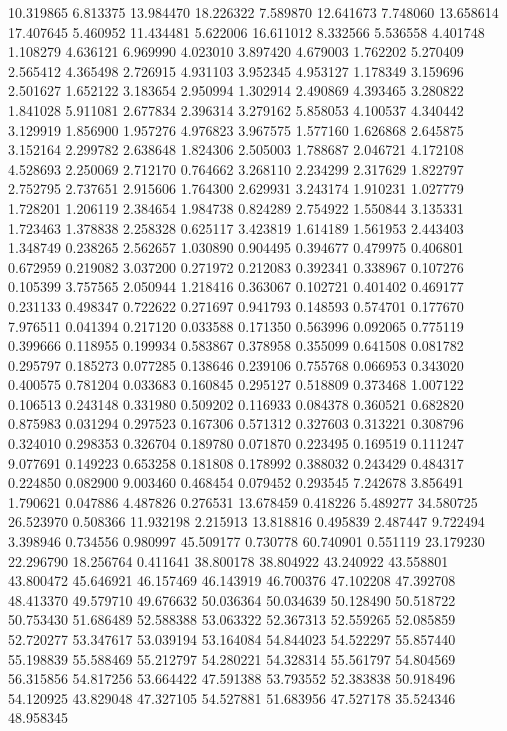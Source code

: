 10.319865
6.813375
13.984470
18.226322
7.589870
12.641673
7.748060
13.658614
17.407645
5.460952
11.434481
5.622006
16.611012
8.332566
5.536558
4.401748
1.108279
4.636121
6.969990
4.023010
3.897420
4.679003
1.762202
5.270409
2.565412
4.365498
2.726915
4.931103
3.952345
4.953127
1.178349
3.159696
2.501627
1.652122
3.183654
2.950994
1.302914
2.490869
4.393465
3.280822
1.841028
5.911081
2.677834
2.396314
3.279162
5.858053
4.100537
4.340442
3.129919
1.856900
1.957276
4.976823
3.967575
1.577160
1.626868
2.645875
3.152164
2.299782
2.638648
1.824306
2.505003
1.788687
2.046721
4.172108
4.528693
2.250069
2.712170
0.764662
3.268110
2.234299
2.317629
1.822797
2.752795
2.737651
2.915606
1.764300
2.629931
3.243174
1.910231
1.027779
1.728201
1.206119
2.384654
1.984738
0.824289
2.754922
1.550844
3.135331
1.723463
1.378838
2.258328
0.625117
3.423819
1.614189
1.561953
2.443403
1.348749
0.238265
2.562657
1.030890
0.904495
0.394677
0.479975
0.406801
0.672959
0.219082
3.037200
0.271972
0.212083
0.392341
0.338967
0.107276
0.105399
3.757565
2.050944
1.218416
0.363067
0.102721
0.401402
0.469177
0.231133
0.498347
0.722622
0.271697
0.941793
0.148593
0.574701
0.177670
7.976511
0.041394
0.217120
0.033588
0.171350
0.563996
0.092065
0.775119
0.399666
0.118955
0.199934
0.583867
0.378958
0.355099
0.641508
0.081782
0.295797
0.185273
0.077285
0.138646
0.239106
0.755768
0.066953
0.343020
0.400575
0.781204
0.033683
0.160845
0.295127
0.518809
0.373468
1.007122
0.106513
0.243148
0.331980
0.509202
0.116933
0.084378
0.360521
0.682820
0.875983
0.031294
0.297523
0.167306
0.571312
0.327603
0.313221
0.308796
0.324010
0.298353
0.326704
0.189780
0.071870
0.223495
0.169519
0.111247
9.077691
0.149223
0.653258
0.181808
0.178992
0.388032
0.243429
0.484317
0.224850
0.082900
9.003460
0.468454
0.079452
0.293545
7.242678
3.856491
1.790621
0.047886
4.487826
0.276531
13.678459
0.418226
5.489277
34.580725
26.523970
0.508366
11.932198
2.215913
13.818816
0.495839
2.487447
9.722494
3.398946
0.734556
0.980997
45.509177
0.730778
60.740901
0.551119
23.179230
22.296790
18.256764
0.411641
38.800178
38.804922
43.240922
43.558801
43.800472
45.646921
46.157469
46.143919
46.700376
47.102208
47.392708
48.413370
49.579710
49.676632
50.036364
50.034639
50.128490
50.518722
50.753430
51.686489
52.588388
53.063322
52.367313
52.559265
52.085859
52.720277
53.347617
53.039194
53.164084
54.844023
54.522297
55.857440
55.198839
55.588469
55.212797
54.280221
54.328314
55.561797
54.804569
56.315856
54.817256
53.664422
47.591388
53.793552
52.383838
50.918496
54.120925
43.829048
47.327105
54.527881
51.683956
47.527178
35.524346
48.958345
